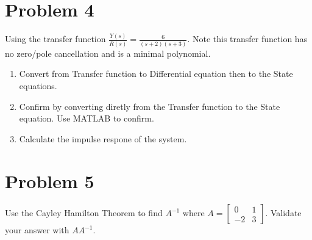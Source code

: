 \documentclass{article}
\begin{document}
\section*{Problem 4}
Using the transfer function $\frac{Y(s)}{R(s)} = \frac{6}{(s+2)(s+3)}$.
\newline
Note this transfer function has no zero/pole cancellation and is a minimal polynomial.
\begin{enumerate}[1)]
\item Convert from Transfer function to Differential equation then to the State equations.
\newline
\item Confirm by converting diretly from the Transfer function to the State equation.
{\color{blue} Use MATLAB to confirm.}
\newline
\item Calculate the impulse respone of the system.
\newline
\end{enumerate}

\section*{Problem 5}
Use the Cayley Hamilton Theorem to find $A^{-1}$ where $A = \begin{bmatrix} 0 & 1 \\ -2 & 3 \end{bmatrix}$.
Validate your answer with $AA^{-1}$.
\newline
\end{document}
